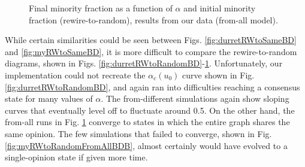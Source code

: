 \documentclass[11pt]{article}
\begin{document}
\begin{figure}
  \centering
  \hspace{3mm}
  \caption{Final minority fraction as a function of $\alpha$ and initial minority fraction (rewire-to-random), results from our data (from-all model).}
  \label{fig:myRWtoRandomFromAllBD}
\end{figure}

While certain similarities could be seen between Figs. \ref{fig:durretRWtoSameBD} and \ref{fig:myRWtoSameBD}, it is more difficult to compare the rewire-to-random diagrams, shown in Figs. \ref{fig:durretRWtoRandomBD}-\ref{fig:myRWtoRandomFromAllBD}. Unfortunately, our implementation could not recreate the $\alpha_{c}(u_{0})$ curve shown in Fig. \ref{fig:durretRWtoRandomBD}, and again ran into difficulties reaching a consensus state for many values of $\alpha$. The from-different simulations again show sloping curves that eventually level off to fluctuate around 0.5. On the other hand, the from-all runs in Fig. \ref{fig:myRWtoRandomFromAllBD} converge to states in which the entire graph shares the same opinion. The few simulations that failed to converge, shown in Fig. \ref{fig:myRWtoRandomFromAllBDB}, almost certainly would have evolved to a single-opinion state if given more time.
\end{document}
